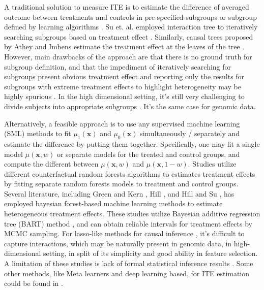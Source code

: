     A traditional solution to measure ITE is to estimate the difference of averaged outcome between treatments and controls in pre-specified subgroups \cite{gail1985testing} or subgroup defined by learning algorithms \cite{su2009subgroup, su2011interaction, athey2016recursive,foster2011subgroup}. Su et. al. employed interaction tree to iteratively searching subgroups based on treatment effect \cite{su2009subgroup,su2011interaction}. Similarly, causal trees proposed by Athey and Imbens estimate the treatment effect at the leaves of the tree \cite{athey2016recursive}. However, main drawbacks of the approach are that there is no ground truth for subgroup definition, and that the impediment of iteratively searching for subgroups present obvious treatment effect and reporting only the results for subgroups with extreme treatment effects to highlight heterogeneity may be highly spurious \cite{assmann2000subgroup,cook2004subgroup}. In the high dimensional setting, it's still very challenging to divide subjects into appropriate subgroups \cite{powers2017some}. It's the same case for genomic data. 
    
    Alternatively, a feasible approach is to use any supervised machine learning (SML) methods to fit $\mu_1(\mathbf{x})$ and $\mu_0(\mathbf{x})$ simultaneously / separately and estimate the difference by putting them together. Specifically, one may fit a single model $\mu(\mathbf{x},w)$ or separate models for the treated and control groups, and compute the different between $\mu(\mathbf{x},w)$ and $\mu(\mathbf{x}, 1-w)$. Studies \cite{lu2018estimating,dasgupta2014risk} utilize different counterfactual random forests algorithms to estimates treatment effects by fitting separate random forests models to treatment and control groups. Several literature, including Green and Kern \cite{green2012modeling}, Hill \cite{hill2011bayesian}, and Hill and Su \cite{hill2013assessing}, has employed bayesian forest-based machine learning methods to estimate heterogeneous treatment effects. These studies utilize Bayesian additive regression tree (BART) method \cite{chipman2010bart}, and can obtain reliable intervals for treatment effects by MCMC sampling. For lasso-like methods for causal inference \cite{imai2013estimating,tian2014simple}, it's difficult to capture interactions, which may be naturally present in genomic data, in high-dimensional setting, in split of its simplicity and good ability in feature selection. A limitation of these studies is lack of formal statistical inference results \cite{wager2018estimation}. Some other methods, like Meta learners and deep learning based, for ITE estimation could be found in \cite{kunzel2019metalearners, johansson2016learning}.

